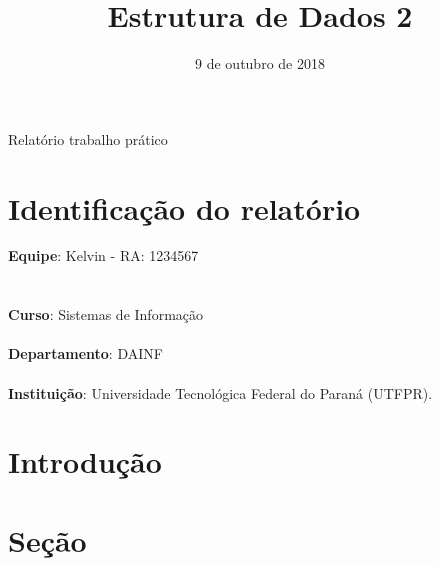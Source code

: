 \documentclass{article}
\title{Estrutura de Dados 2}
\date{9 de outubro de 2018}
\begin{document}
\maketitle

\begin{center}
Relatório trabalho prático    
\end{center}
\vfill
\section{Identificação do relatório\\}
\textbf{Equipe}: Kelvin - RA: 1234567\\
\hspace*{43pt}{Rafael Lammel Marinheiro - RA: 1986856}\\\\
\textbf{Curso}: Sistemas de Informação\\\\
\textbf{Departamento}: DAINF\\\\
\textbf{Instituição}: Universidade Tecnológica Federal do Paraná (UTFPR).

\newpage

\section{Introdução}

\section{Seção}
\end{document}
